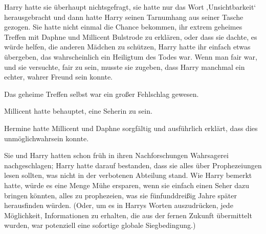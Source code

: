 Harry hatte sie überhaupt nichtsgefragt, sie hatte nur das Wort ‚Unsichtbarkeit‘ herausgebracht und dann hatte Harry seinen Tarnumhang aus seiner Tasche gezogen. Sie hatte nicht einmal die Chance bekommen, ihr extrem geheimes Treffen mit Daphne und Millicent Bulstrode zu erklären, oder dass sie dachte, es würde helfen, die anderen Mädchen zu schützen, Harry hatte ihr einfach etwas übergeben, das wahrscheinlich ein Heiligtum des Todes war. Wenn man fair war, und sie versuchte, fair zu sein, musste sie zugeben, dass Harry manchmal ein echter, wahrer Freund sein konnte.

Das geheime Treffen selbst war ein großer Fehlschlag gewesen.

Millicent hatte behauptet, eine Seherin zu sein.

Hermine hatte Millicent und Daphne sorgfältig und ausführlich erklärt, dass dies unmöglichwahrsein konnte.

Sie und Harry hatten schon früh in ihren Nachforschungen Wahrsagerei nachgeschlagen; Harry hatte darauf bestanden, dass sie alles über Prophezeiungen lesen sollten, was nicht in der verbotenen Abteilung stand. Wie Harry bemerkt hatte, würde es eine Menge Mühe ersparen, wenn sie einfach einen Seher dazu bringen könnten, alles zu prophezeien, was sie fünfunddreißig Jahre später herausfinden würden. (Oder, um es in Harrys Worten auszudrücken, jede Möglichkeit, Informationen zu erhalten, die aus der fernen Zukunft übermittelt wurden, war potenziell eine sofortige globale Siegbedingung.)

